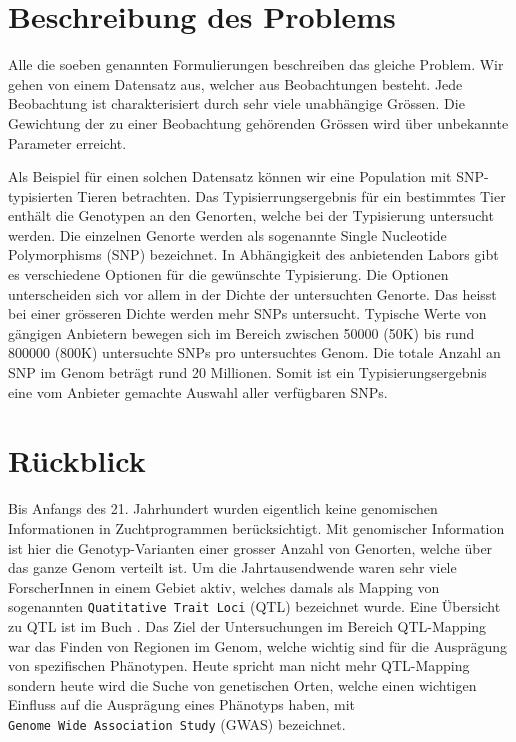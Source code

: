 \documentclass[]{book}
\begin{document}
\section{Beschreibung des Problems}\label{problem}

Alle die soeben genannten Formulierungen beschreiben das gleiche
Problem. Wir gehen von einem Datensatz aus, welcher aus Beobachtungen
besteht. Jede Beobachtung ist charakterisiert durch sehr viele
unabhängige Grössen. Die Gewichtung der zu einer Beobachtung gehörenden
Grössen wird über unbekannte Parameter erreicht.

Als Beispiel für einen solchen Datensatz können wir eine Population mit
SNP-typisierten Tieren betrachten. Das Typisierrungsergebnis für ein
bestimmtes Tier enthält die Genotypen an den Genorten, welche bei der
Typisierung untersucht werden. Die einzelnen Genorte werden als
sogenannte Single Nucleotide Polymorphisms (SNP) bezeichnet. In
Abhängigkeit des anbietenden Labors gibt es verschiedene Optionen für
die gewünschte Typisierung. Die Optionen unterscheiden sich vor allem in
der Dichte der untersuchten Genorte. Das heisst bei einer grösseren
Dichte werden mehr SNPs untersucht. Typische Werte von gängigen
Anbietern bewegen sich im Bereich zwischen 50000 (50K) bis rund 800000
(800K) untersuchte SNPs pro untersuchtes Genom. Die totale Anzahl an SNP
im Genom beträgt rund 20 Millionen. Somit ist ein Typisierungsergebnis
eine vom Anbieter gemachte Auswahl aller verfügbaren SNPs.

\section{Rückblick}\label{background}

Bis Anfangs des 21. Jahrhundert wurden eigentlich keine genomischen
Informationen in Zuchtprogrammen berücksichtigt. Mit genomischer
Information ist hier die Genotyp-Varianten einer grosser Anzahl von
Genorten, welche über das ganze Genom verteilt ist. Um die
Jahrtausendwende waren sehr viele ForscherInnen in einem Gebiet aktiv,
welches damals als Mapping von sogenannten
\texttt{Quatitative\ Trait\ Loci} (QTL) bezeichnet wurde. Eine Übersicht
zu QTL ist im Buch \citep{BBC2008}. Das Ziel der Untersuchungen im
Bereich QTL-Mapping war das Finden von Regionen im Genom, welche wichtig
sind für die Ausprägung von spezifischen Phänotypen. Heute spricht man
nicht mehr QTL-Mapping sondern heute wird die Suche von genetischen
Orten, welche einen wichtigen Einfluss auf die Ausprägung eines
Phänotyps haben, mit \texttt{Genome\ Wide\ Association\ Study} (GWAS)
bezeichnet.
\end{document}
